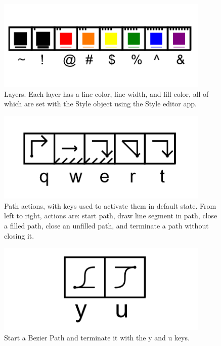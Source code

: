 \begin{figure}
	\centering
	\includegraphics[width=4in]{figures/web2d/colors.png}
	\caption[colors]
	{Layers. Each layer has a line color, line width, and fill color, all of which are set with the Style object using the Style editor app.}
\end{figure}


\begin{figure}
	\centering
	\includegraphics[width=4in]{figures/web2d/pathactions.png}
	\caption[pathactions]
	{Path actions, with keys used to activate them in default state.  From left to right, actions are: start path, draw line segment in path, close a filled path, close an unfilled path, and terminate a path without closing it.}
\end{figure}

\begin{figure}
	\centering
	\includegraphics[width=4in]{figures/web2d/bezieractions.png}
	\caption[bezieractions]
	{Start a Bezier Path and terminate it with the y and u keys.}
\end{figure}


